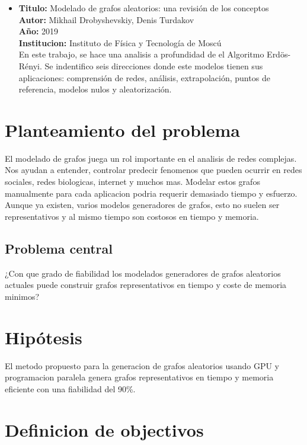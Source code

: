 \documentclass[11pt]{extarticle}
\begin{document}
\begin{itemize}
  \item \textbf{Titulo:} Modelado de grafos aleatorios: una revisión de los conceptos\\
  \textbf{Autor:} Mikhail Drobyshevskiy, Denis Turdakov\\
  \textbf{A\~no:} 2019\\
  \textbf{Institucion:} Instituto de Física y Tecnología de Moscú\\
  En este trabajo, se hace una analisis a profundidad de el Algoritmo Erdös-Rényi.
  Se indentifico seis direcciones donde este modelos tienen sus aplicaciones: comprensión de redes, análisis, extrapolación, puntos de referencia, modelos nulos y aleatorización. 

\end{itemize}



\section{Planteamiento del problema}
  El modelado de grafos juega un rol importante en el analisis de redes complejas. 
  Nos ayudan a entender, controlar predecir fenomenos que pueden ocurrir en redes sociales, 
  redes biologicas, internet y muchos mas. Modelar estos grafos manualmente para cada aplicacion podria requerir
  demasiado tiempo y esfuerzo. Aunque ya existen, varios modelos generadores de grafos, esto no suelen ser representativos
  y al mismo tiempo son costosos en tiempo y memoria.
  \subsection{Problema central}
     ¿Con que grado de fiabilidad los modelados generadores de grafos aleatorios actuales puede construir grafos representativos en tiempo y coste de memoria minimos? 

\section{Hip\'otesis}
  El metodo propuesto para la generacion de grafos aleatorios usando GPU y programacion paralela 
  genera grafos representativos en tiempo y memoria eficiente con una fiabilidad del 90\%.

\section{Definicion de objectivos}
\end{document}
